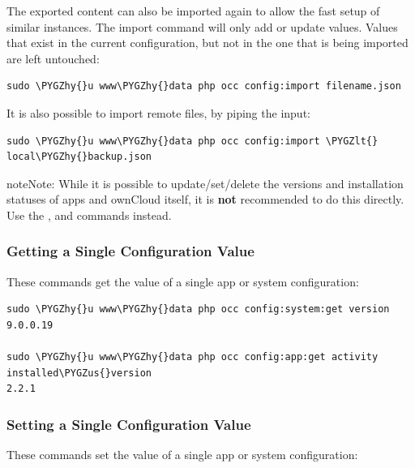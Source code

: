 \documentclass[letterpaper,10pt,english]{sphinxmanual}
\def\PYGZus{\char`\_}
\def\PYGZlt{\char`\<}
\def\PYGZhy{\char`\-}
\begin{document}
The exported content can also be imported again to allow the fast setup of
similar instances. The import command will only add or update values. Values
that exist in the current configuration, but not in the one that is being
imported are left untouched:

\begin{Verbatim}[commandchars=\\\{\}]
sudo \PYGZhy{}u www\PYGZhy{}data php occ config:import filename.json
\end{Verbatim}

It is also possible to import remote files, by piping the input:

\begin{Verbatim}[commandchars=\\\{\}]
sudo \PYGZhy{}u www\PYGZhy{}data php occ config:import \PYGZlt{} local\PYGZhy{}backup.json
\end{Verbatim}

\begin{notice}{note}{Note:}
While it is possible to update/set/delete the versions and installation
statuses of apps and ownCloud itself, it is \textbf{not} recommended to do this
directly. Use the ,  and 
commands instead.
\end{notice}


\subsubsection{Getting a Single Configuration Value}
\label{configuration_server/occ_command:getting-a-single-configuration-value}
These commands get the value of a single app or system configuration:

\begin{Verbatim}[commandchars=\\\{\}]
sudo \PYGZhy{}u www\PYGZhy{}data php occ config:system:get version
9.0.0.19

sudo \PYGZhy{}u www\PYGZhy{}data php occ config:app:get activity installed\PYGZus{}version
2.2.1
\end{Verbatim}


\subsubsection{Setting a Single Configuration Value}
\label{configuration_server/occ_command:setting-a-single-configuration-value}
These commands set the value of a single app or system configuration:
\end{document}
